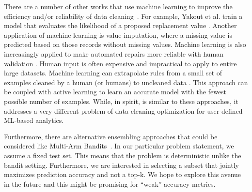  There are a number of other works that use machine learning to improve the efficiency and/or reliability of data cleaning~\cite{DBLP:journals/pvldb/YakoutENOI11,yakout2013don,gokhale2014corleone}.
For example, Yakout et al. train a model that evaluates the likelihood of a proposed replacement value \cite{yakout2013don}.
Another application of machine learning is value imputation, where a missing value is predicted based on those records without missing values.
Machine learning is also increasingly applied to make automated repairs more reliable with human validation \cite{DBLP:journals/pvldb/YakoutENOI11}.
Human input is often expensive and impractical to apply to entire large datasets.
Machine learning can extrapolate rules from a small set of examples cleaned by a human (or humans) to uncleaned data \cite{gokhale2014corleone, DBLP:journals/pvldb/YakoutENOI11}.
This approach can be coupled with active learning \cite{DBLP:journals/pvldb/MozafariSFJM14} to learn an accurate model with the fewest possible number of examples.
While, in spirit, \sys is similar to these approaches, it addresses a very different problem of data cleaning optimization for user-defined ML-based analytics.

 Furthermore, there are alternative ensembling approaches that could be considered like Multi-Arm Bandits~\cite{bubeck2013multiple}. 
In our particular problem statement, we assume a fixed test set.
This means that the problem is deterministic unlike the bandit setting.
Furthermore, we are interested in selecting a subset that jointly maximizes prediction accuracy and not a top-k.
We hope to explore this avenue in the future and this might be promising for ``weak'' accuracy metrics.




